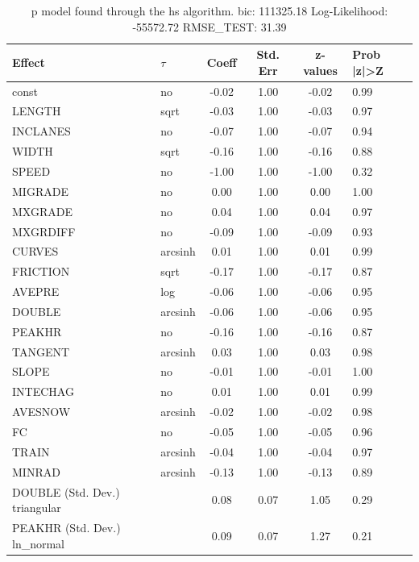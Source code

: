 \begin{table}
	\caption{p model found through the hs algorithm. bic: 111325.18 Log-Likelihood: -55572.72 RMSE_TEST: 31.39}
	\begin{center}
		\begin{tabular}{|l|l|c|c|c|l|}
			\hline
			Effect & $\tau$ & Coeff & Std. Err & z-values & Prob |z|>Z \\
			\hline
			const & no & -0.02 & 1.00 & -0.02 & 0.99 \\
			\hline
			LENGTH & sqrt & -0.03 & 1.00 & -0.03 & 0.97 \\
			\hline
			INCLANES & no & -0.07 & 1.00 & -0.07 & 0.94 \\
			\hline
			WIDTH & sqrt & -0.16 & 1.00 & -0.16 & 0.88 \\
			\hline
			SPEED & no & -1.00 & 1.00 & -1.00 & 0.32 \\
			\hline
			MIGRADE & no & 0.00 & 1.00 & 0.00 & 1.00 \\
			\hline
			MXGRADE & no & 0.04 & 1.00 & 0.04 & 0.97 \\
			\hline
			MXGRDIFF & no & -0.09 & 1.00 & -0.09 & 0.93 \\
			\hline
			CURVES & arcsinh & 0.01 & 1.00 & 0.01 & 0.99 \\
			\hline
			FRICTION & sqrt & -0.17 & 1.00 & -0.17 & 0.87 \\
			\hline
			AVEPRE & log & -0.06 & 1.00 & -0.06 & 0.95 \\
			\hline
			DOUBLE & arcsinh & -0.06 & 1.00 & -0.06 & 0.95 \\
			\hline
			PEAKHR & no & -0.16 & 1.00 & -0.16 & 0.87 \\
			\hline
			TANGENT & arcsinh & 0.03 & 1.00 & 0.03 & 0.98 \\
			\hline
			SLOPE & no & -0.01 & 1.00 & -0.01 & 1.00 \\
			\hline
			INTECHAG & no & 0.01 & 1.00 & 0.01 & 0.99 \\
			\hline
			AVESNOW & arcsinh & -0.02 & 1.00 & -0.02 & 0.98 \\
			\hline
			FC & no & -0.05 & 1.00 & -0.05 & 0.96 \\
			\hline
			TRAIN & arcsinh & -0.04 & 1.00 & -0.04 & 0.97 \\
			\hline
			MINRAD & arcsinh & -0.13 & 1.00 & -0.13 & 0.89 \\
			\hline
			DOUBLE (Std. Dev.) triangular &  & 0.08 & 0.07 & 1.05 & 0.29 \\
			\hline
			PEAKHR (Std. Dev.) ln_normal &  & 0.09 & 0.07 & 1.27 & 0.21 \\

\end{tabular}
\end{center}
\end{table}
